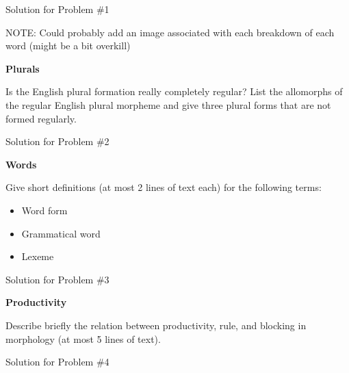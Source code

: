 \documentclass[11pt]{article}
\begin{document}
\begin{solution}
Solution for Problem \#1

NOTE: Could probably add an image associated with each breakdown of each word (might be a bit overkill)
\end{solution}

\vspace*{0.5cm} %

\begin{problem}{2}
\textbf{Plurals}

Is the English plural formation really completely regular? List the allomorphs of the regular English plural morpheme and give three plural forms that are not formed regularly.
\end{problem}

\begin{solution}
Solution for Problem \#2
\end{solution}

\vspace*{0.5cm}

\begin{problem}{3}
\textbf{Words}

Give short definitions (at most 2 lines of text each) for the following terms:
\begin{itemize}
	\item Word form
	\item Grammatical word
	\item Lexeme
\end{itemize}

\end{problem}

\begin{solution}
Solution for Problem \#3
\end{solution}

\vspace*{0.5cm}

\begin{problem}{4}
\textbf{Productivity}

Describe briefly the relation between productivity, rule, and blocking in morphology (at most
5 lines of text).

\end{problem}

\begin{solution}
Solution for Problem \#4
\end{solution}
\end{document}
